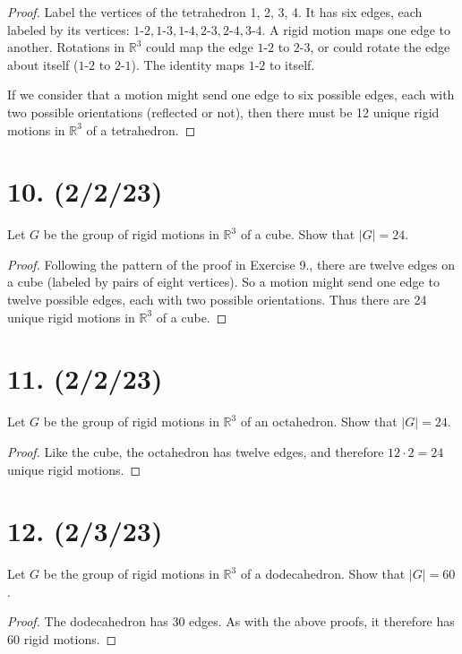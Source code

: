 \documentclass{article}
\begin{document}
\begin{proof}
    Label the vertices of the tetrahedron 1, 2, 3, 4. It has six edges, each labeled by its vertices: $1\textrm{-}2, 1\textrm{-}3, 1\textrm{-}4, 2\textrm{-}3, 2\textrm{-}4, 3\textrm{-}4$. A rigid motion maps one edge to another. Rotations in $\mathbb{R}^3$ could map the edge $1\textrm{-}2$ to $2\textrm{-}3$, or could rotate the edge about itself ($1\textrm{-}2$ to $2\textrm{-}1$). The identity maps $1\textrm{-}2$ to itself.

    If we consider that a motion might send one edge to six possible edges, each with two possible orientations (reflected or not), then there must be 12 unique rigid motions in $\mathbb{R}^3$ of a tetrahedron.
\end{proof}

\section*{10. (2/2/23)}

Let $G$ be the group of rigid motions in $\mathbb{R}^3$ of a cube. Show that $|G| = 24$.

\begin{proof}
    Following the pattern of the proof in Exercise 9., there are twelve edges on a cube (labeled by pairs of eight vertices). So a motion might send one edge to twelve possible edges, each with two possible orientations. Thus there are 24 unique rigid motions in $\mathbb{R}^3$ of a cube.
\end{proof}

\section*{11. (2/2/23)}

Let $G$ be the group of rigid motions in $\mathbb{R}^3$ of an octahedron. Show that $|G| = 24$.

\begin{proof}
    Like the cube, the octahedron has twelve edges, and therefore $12 \cdot 2 = 24$ unique rigid motions.
\end{proof}

\section*{12. (2/3/23)}

Let $G$ be the group of rigid motions in $\mathbb{R}^3$ of a dodecahedron. Show that $|G| = 60$.

\begin{proof}
    The dodecahedron has 30 edges. As with the above proofs, it therefore has 60 rigid motions.
\end{proof}
\end{document}
